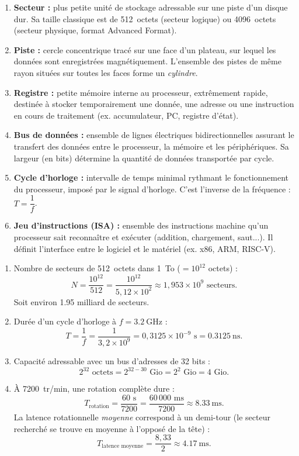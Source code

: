 \documentclass[11pt]{article}
\begin{document}
\begin{corrige}
\begin{enumerate}
    \item \textbf{Secteur :} plus petite unité de stockage adressable sur une piste d'un disque dur. Sa taille classique est de \SI{512}{octets} (secteur logique) ou \SI{4096}{octets} (secteur physique, format Advanced Format).
    \item \textbf{Piste :} cercle concentrique tracé sur une face d'un plateau, sur lequel les données sont enregistrées magnétiquement. L'ensemble des pistes de même rayon situées sur toutes les faces forme un \emph{cylindre}.
    \item \textbf{Registre :} petite mémoire interne au processeur, extrêmement rapide, destinée à stocker temporairement une donnée, une adresse ou une instruction en cours de traitement (ex. accumulateur, PC, registre d'état).
    \item \textbf{Bus de données :} ensemble de lignes électriques bidirectionnelles assurant le transfert des données entre le processeur, la mémoire et les périphériques. Sa largeur (en bits) détermine la quantité de données transportée par cycle.
    \item \textbf{Cycle d'horloge :} intervalle de temps minimal rythmant le fonctionnement du processeur, imposé par le signal d'horloge. C'est l'inverse de la fréquence : $T = \dfrac{1}{f}$.
    \item \textbf{Jeu d'instructions (ISA) :} ensemble des instructions machine qu'un processeur sait reconnaître et exécuter (addition, chargement, saut...). Il définit l'interface entre le logiciel et le matériel (ex. x86, ARM, RISC-V).
\end{enumerate}
\end{corrige}

\begin{corrige}
\begin{enumerate}
    \item Nombre de secteurs de \SI{512}{octets} dans \SI{1}{To} ($= 10^{12}$ octets) :
    \[ N = \frac{10^{12}}{512} = \frac{10^{12}}{5,12 \times 10^{2}} \approx 1,953 \times 10^{9} \text{ secteurs}. \]
    Soit environ \num{1,95} milliard de secteurs.
    \item Durée d'un cycle d'horloge à $f = \SI{3,2}{\giga\hertz}$ :
    \[ T = \frac{1}{f} = \frac{1}{3,2 \times 10^{9}} = 0,3125 \times 10^{-9} \text{ s} = \SI{0,3125}{\nano\second}. \]
    \item Capacité adressable avec un bus d'adresses de 32 bits :
    \[ 2^{32} \text{ octets} = 2^{32-30} \text{ Gio} = 2^2 \text{ Gio} = 4 \text{ Gio}. \]
    \item À \SI{7200}{tr/min}, une rotation complète dure :
    \[ T_{\text{rotation}} = \frac{60 \text{ s}}{7200} = \frac{60\,000 \text{ ms}}{7200} \approx \SI{8,33}{\milli\second}. \]
    La latence rotationnelle \emph{moyenne} correspond à un demi-tour (le secteur recherché se trouve en moyenne à l'opposé de la tête) :
    \[ T_{\text{latence moyenne}} = \frac{8,33}{2} \approx \SI{4,17}{\milli\second}. \]
\end{enumerate}
\end{corrige}
\end{document}
